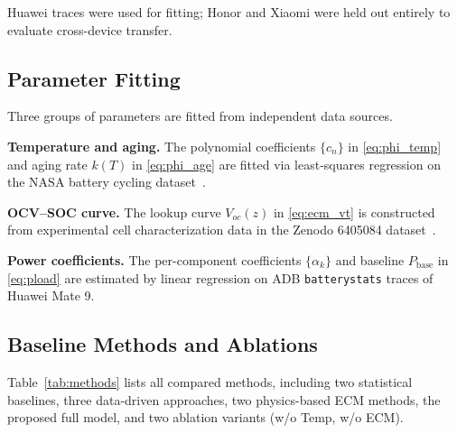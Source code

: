 \documentclass[conference]{IEEEtran}
\begin{document}
Huawei traces were used for fitting; Honor and Xiaomi were held out entirely to evaluate cross-device transfer.

\subsection{Parameter Fitting}

Three groups of parameters are fitted from independent data sources.

\textbf{Temperature and aging.} The polynomial coefficients $\{c_n\}$ in \eqref{eq:phi_temp} and aging rate $k(T)$ in \eqref{eq:phi_age} are fitted via least-squares regression on the NASA battery cycling dataset~\cite{nasa_dataset}.

\textbf{OCV--SOC curve.} The lookup curve $V_{oc}(z)$ in \eqref{eq:ecm_vt} is constructed from experimental cell characterization data in the Zenodo 6405084 dataset~\cite{jiangong_zhu_2022_6405084}.

\textbf{Power coefficients.} The per-component coefficients $\{\alpha_k\}$ and baseline $P_{\mathrm{base}}$ in \eqref{eq:pload} are estimated by linear regression on ADB \texttt{batterystats} traces of Huawei Mate 9.

\subsection{Baseline Methods and Ablations}

Table~\ref{tab:methods} lists all compared methods, including two statistical baselines, three data-driven approaches, two physics-based ECM methods, the proposed full model, and two ablation variants (w/o Temp, w/o ECM).
\end{document}
